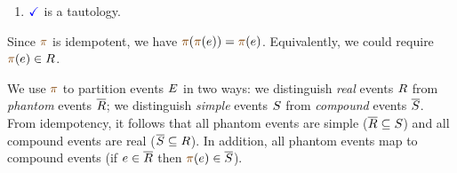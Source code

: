 \begin{definition}
\begin{multicols}{2}
\begin{enumerate}[,label=(\textsc{c}\arabic*),ref=\textsc{c}\arabic*]
      \setcounter{enumi}{\value{Bterm}}
    \item \label{top-term-c11}
      $\aTerm$ is a tautology.
    \end{enumerate}
  \end{multicols}
\end{definition}
Since $\fmrg{}$ is idempotent, we have $\fmrg{\fmrg{\aEv}} = \fmrg{\aEv}$.
Equivalently, we could require $\fmrg{\aEv}\in\reEvs$.

We use $\fmrg{}$ to partition events $E$ in two ways: we distinguish
\emph{real} events $R$ from \emph{phantom} events $\overline{R}$; we
distinguish \emph{simple} events $S$ from \emph{compound} events
$\overline{S}$.   From idempotency, it follows that all phantom events are simple
($\overline{R}\subseteq S$) and all compound events are real
($\overline{S}\subseteq R$).  In addition, all phantom events map to compound
events (if $e\in\overline{R}$ then $\fmrg{\aEv}\in\dmEvs$).


